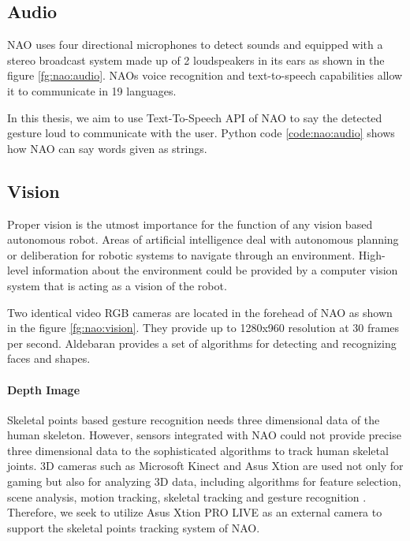  \label{code:nao:motion}

\subsection{Audio} NAO uses four directional microphones to detect sounds and equipped with a stereo broadcast system made up of 2 loudspeakers in its ears as shown in the figure \ref{fg:nao:audio}. NAOs voice recognition and text-to-speech capabilities allow it to communicate in 19 languages. 

 

In this thesis, we aim to use Text-To-Speech API of NAO to say the detected gesture loud to communicate with the user. Python code \ref{code:nao:audio} shows how NAO can say words given as strings.

 \label{code:nao:audio}



\subsection{Vision} \label{sec:nao:vision} Proper vision is the utmost importance for the function of any vision based autonomous robot. Areas of artificial intelligence deal with autonomous planning or deliberation for robotic systems to navigate through an environment. High-level information about the environment could be provided by a computer vision system that is acting as a vision of the robot.

Two identical video RGB cameras are located in the forehead of NAO as shown in the figure \ref{fg:nao:vision}. They provide up to 1280x960 resolution at 30 frames per second. Aldebaran provides a set of algorithms for detecting and recognizing faces and shapes.

\paragraph*{Depth Image} Skeletal points based gesture recognition needs three dimensional data of the human skeleton. However, sensors integrated with NAO could not provide precise three dimensional data to the sophisticated algorithms to track human skeletal joints. 3D cameras such as Microsoft Kinect and Asus Xtion are used not only for gaming but also for analyzing 3D data, including algorithms for feature selection, scene analysis, motion tracking, skeletal tracking and gesture recognition \cite{9}. Therefore, we seek to utilize Asus Xtion PRO LIVE as an external camera to support the skeletal points tracking system of NAO. 

